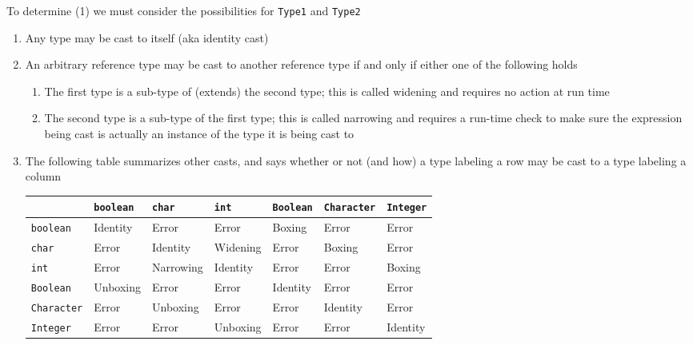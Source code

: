 \documentclass[8pt,a4paper,compress]{beamer}
\begin{document}
\begin{frame}[fragile]
\pause

To determine (1) we must consider the possibilities for \lstinline{Type1} and \lstinline{Type2}
\begin{enumerate}
\item Any type may be cast to itself (aka identity cast)
\item An arbitrary reference type may be cast to another reference type if and only if either one of the following holds
\begin{enumerate}
\item The first type is a sub-type of (extends) the second type; this is called widening and requires no action at run time
\item The second type is a sub-type of the first type; this is called narrowing and requires a run-time check to make sure the expression being cast is actually an instance of the type it is being cast to
\end{enumerate}
\item The following table summarizes other casts, and says whether or not (and how) a type labeling a row may be cast to a type labeling a column
\begin{center}
    \begin{tabular}{ | l | l | l | l | l | l | l | }
    \hline
    & \lstinline$boolean$   & \lstinline$char$    & \lstinline$int$ & \lstinline$Boolean$ &
                \lstinline$Character$ & \lstinline$Integer$   \\ \hline

   \lstinline$boolean$   & Identity & Error     & Error    & Boxing  & Error  & Error \\ \hline
   \lstinline$char$      & Error    & Identity  & Widening & Error   & Boxing & Error \\ \hline
   \lstinline$int$       & Error    & Narrowing & Identity & Error   & Error      & Boxing \\ \hline
   \lstinline$Boolean$   & Unboxing & Error     & Error    & Identity & Error   & Error \\ \hline
   \lstinline$Character$ & Error    & Unboxing  & Error    & Error    & Identity & Error \\ \hline
   \lstinline$Integer$   & Error    & Error     & Unboxing & Error    & Error   & Identity \\ \hline
    \end{tabular}
\end{center}
\end{enumerate}
\end{frame}
\end{document}
